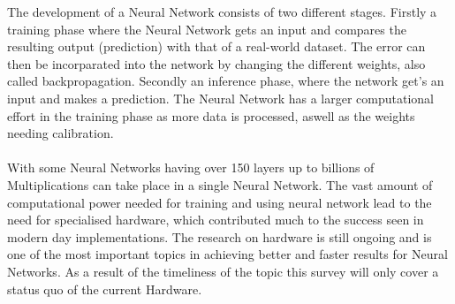 \documentclass[conference]{IEEEtran}
\begin{document}
The development of a Neural Network consists of two different stages. Firstly a training phase where the Neural Network gets an input and compares the resulting output (prediction) with that of a real-world dataset. The error can then be incorparated into the network by changing the different weights, also called backpropagation. Secondly an inference phase, where the network get's an input and makes a prediction. The Neural Network has a larger computational effort in the training phase as more data is processed, aswell as the weights needing calibration.
\\
\\
With some Neural Networks having over 150 layers \cite{densely_network} up to billions of Multiplications can take place in a single Neural Network. The vast amount of computational power needed for training and using neural network lead to the need for specialised hardware, which contributed much to the success seen in modern day implementations. The research on hardware is still ongoing and is one of the most important topics in achieving better and faster results for Neural Networks. As a result of the timeliness of the topic this survey will only cover a status quo of the current Hardware.
\\
\end{document}
